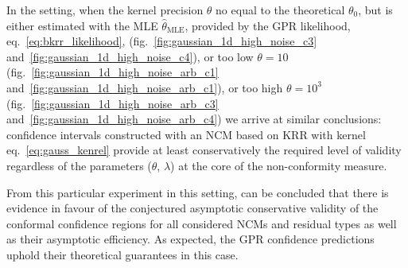 \documentclass[a4paper,14pt]{extarticle}
\begin{document}
In the setting, when the kernel precision $\theta$ no equal to the theoretical $\theta_0$,
but is either estimated with the MLE $\hat{\theta}_\text{MLE}$, provided by the GPR
likelihood, eq.~\ref{eq:bkrr_likelihood}, (fig.~\ref{fig:gaussian_1d_high_noise_c3}
and~\ref{fig:gaussian_1d_high_noise_c4}), or too low $\theta=10$ (fig.~\ref{fig:gaussian_1d_high_noise_arb_c1}
and~\ref{fig:gaussian_1d_high_noise_arb_c1}), or too high $\theta=10^3$ (fig.~\ref{fig:gaussian_1d_high_noise_arb_c3}
and~\ref{fig:gaussian_1d_high_noise_arb_c4}) we arrive at similar conclusions: confidence
intervals constructed with an NCM based on KRR with kernel eq.~\ref{eq:gauss_kenrel}
provide at least conservatively the required level of validity regardless of the
parameters ($\theta$, $\lambda$) at the core of the non-conformity measure.

From this particular experiment in this setting, can be concluded that there is evidence
in favour of the conjectured asymptotic conservative validity of the conformal confidence
regions for all considered NCMs and residual types as well as their asymptotic efficiency.
As expected, the GPR confidence predictions uphold their theoretical guarantees in
this case.
\end{document}
